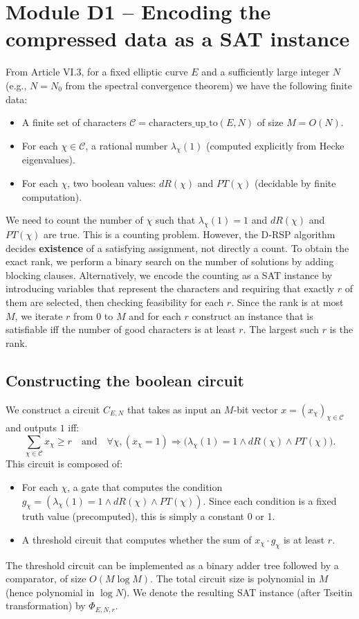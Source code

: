 \documentclass[11pt,a4paper]{article}
\begin{document}
\section{Module D1 – Encoding the compressed data as a SAT instance}

From Article VI.3, for a fixed elliptic curve \(E\) and a sufficiently large integer \(N\) (e.g., \(N = N_0\) from the spectral convergence theorem) we have the following finite data:
\begin{itemize}
\item A finite set of characters \(\mathcal{C} = \text{characters\_up\_to}(E,N)\) of size \(M = O(N)\).
\item For each \(\chi \in \mathcal{C}\), a rational number \(\lambda_\chi(1)\) (computed explicitly from Hecke eigenvalues).
\item For each \(\chi\), two boolean values: \(dR(\chi)\) and \(PT(\chi)\) (decidable by finite computation).
\end{itemize}

We need to count the number of \(\chi\) such that \(\lambda_\chi(1)=1\) and \(dR(\chi)\) and \(PT(\chi)\) are true. This is a counting problem. However, the D‑RSP algorithm decides \textbf{existence} of a satisfying assignment, not directly a count. To obtain the exact rank, we perform a binary search on the number of solutions by adding blocking clauses. Alternatively, we encode the counting as a SAT instance by introducing variables that represent the characters and requiring that exactly \(r\) of them are selected, then checking feasibility for each \(r\). Since the rank is at most \(M\), we iterate \(r\) from \(0\) to \(M\) and for each \(r\) construct an instance that is satisfiable iff the number of good characters is at least \(r\). The largest such \(r\) is the rank.

\subsection{Constructing the boolean circuit}

We construct a circuit \(C_{E,N}\) that takes as input an \(M\)-bit vector \(x = (x_\chi)_{\chi\in\mathcal{C}}\) and outputs \(1\) iff:
\[
\sum_{\chi \in \mathcal{C}} x_\chi \ge r \quad\text{and}\quad \forall \chi, (x_\chi = 1) \Rightarrow \bigl(\lambda_\chi(1)=1 \land dR(\chi) \land PT(\chi)\bigr).
\]
This circuit is composed of:
\begin{itemize}
\item For each \(\chi\), a gate that computes the condition \(g_\chi = (\lambda_\chi(1)=1 \land dR(\chi) \land PT(\chi))\). Since each condition is a fixed truth value (precomputed), this is simply a constant 0 or 1.
\item A threshold circuit that computes whether the sum of \(x_\chi \cdot g_\chi\) is at least \(r\).
\end{itemize}
The threshold circuit can be implemented as a binary adder tree followed by a comparator, of size \(O(M \log M)\). The total circuit size is polynomial in \(M\) (hence polynomial in \(\log N\)). We denote the resulting SAT instance (after Tseitin transformation) by \(\Phi_{E,N,r}\).
\end{document}
